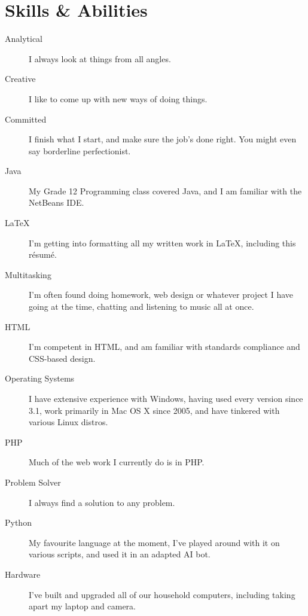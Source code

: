 \documentclass[letterpaper]{resume}
\begin{document}
\section{Skills \& Abilities}
	\begin{description}
		\item[Analytical] I always look at things from all angles.
		\item[Creative] I like to come up with new ways of doing things.
		\item[Committed] I finish what I start, and make sure the job's done right. You might even say borderline perfectionist.
		\item[Java] My Grade 12 Programming class covered Java, and I am familiar with the NetBeans IDE.
		\item[\LaTeX] I'm getting into formatting all my written work in \LaTeX, including this r\'{e}sum\'{e}.
		\item[Multitasking] I'm often found doing homework, web design or whatever project I have going at the time, chatting and listening to music all at once.
		\item[HTML] I'm competent in HTML, and am familiar with standards compliance and CSS-based design.
		\item[Operating Systems] I have extensive experience with Windows, having used every version since 3.1, work primarily in Mac OS X since 2005, and have tinkered with various Linux distros.
		\item[PHP] Much of the web work I currently do is in PHP.
		\item[Problem Solver] I always find a solution to any problem.
		\item[Python] My favourite language at the moment, I've played around with it on various scripts, and used it in an adapted AI bot.
		\item[Hardware] I've built and upgraded all of our household computers, including taking apart my laptop and camera.
	\end{description}
\end{document}
